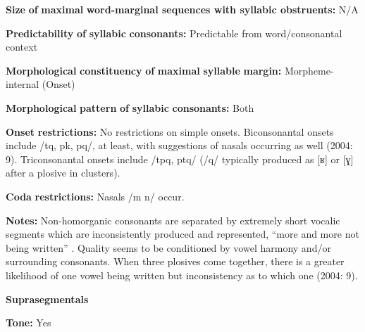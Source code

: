 \documentclass[output=paper]{langsci/langscibook}
\begin{document}
\begin{styleBody}
\textbf{Size} \textbf{of} \textbf{maximal} \textbf{word{}-marginal sequences with syllabic obstruents:} N/A
\end{styleBody}

\begin{styleBody}
\textbf{Predictability} \textbf{of} \textbf{syllabic} \textbf{consonants:} Predictable from word/consonantal context
\end{styleBody}

\begin{styleBody}
\textbf{Morphological} \textbf{constituency} \textbf{of} \textbf{maximal} \textbf{syllable} \textbf{margin:} Morpheme-internal (Onset)
\end{styleBody}

\begin{styleBody}
\textbf{Morphological} \textbf{pattern} \textbf{of} \textbf{syllabic} \textbf{consonants:} Both
\end{styleBody}

\begin{styleBody}
\textbf{Onset} \textbf{restrictions:} No restrictions on simple onsets. Biconsonantal onsets include /tq, pk, pq/, at least, with suggestions of nasals occurring as well (2004: 9). Triconsonantal onsets include /tpq, ptq/ (/q/ typically produced as [ʁ] or [ɣ] after a plosive in clusters). 
\end{styleBody}

\begin{styleBody}
\textbf{Coda} \textbf{restrictions:} Nasals /m n/ occur.
\end{styleBody}

\begin{styleBody}
\textbf{Notes:} Non-homorganic consonants are separated by extremely short vocalic segments which are inconsistently produced and represented, “more and more not being written” \citep[226]{Whitehead2004}. Quality seems to be conditioned by vowel harmony and/or surrounding consonants. When three plosives come together, there is a greater likelihood of one vowel being written but inconsistency as to which one (2004: 9).
\end{styleBody}

\begin{styleBody}
\textbf{Suprasegmentals}
\end{styleBody}

\begin{styleBody}
\textbf{Tone:} Yes
\end{styleBody}
\end{document}

